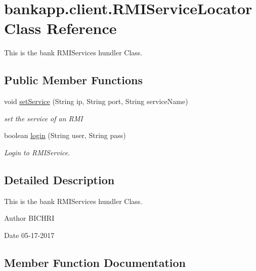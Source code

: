 \hypertarget{classbankapp_1_1client_1_1RMIServiceLocator}{}\section{bankapp.\+client.\+R\+M\+I\+Service\+Locator Class Reference}
\label{classbankapp_1_1client_1_1RMIServiceLocator}


This is the bank R\+M\+I\+Services hundler Class.  


\subsection*{Public Member Functions}
\begin{DoxyCompactItemize}
\item 
void \hyperlink{classbankapp_1_1client_1_1RMIServiceLocator_a9a1605fa6be3933008e90db56b804007}{set\+Service} (String ip, String port, String service\+Name)
\begin{DoxyCompactList}\small\item\em set the service of an R\+MI \end{DoxyCompactList}\item 
boolean \hyperlink{classbankapp_1_1client_1_1RMIServiceLocator_a2287058ad6e7eaa5b38303c02102d740}{login} (String user, String pass)
\begin{DoxyCompactList}\small\item\em Login to R\+M\+I\+Service. \end{DoxyCompactList}\end{DoxyCompactItemize}


\subsection{Detailed Description}
This is the bank R\+M\+I\+Services hundler Class. 

\begin{DoxyAuthor}{Author}
B\+I\+C\+H\+RI 
\end{DoxyAuthor}
\begin{DoxyDate}{Date}
05-\/17-\/2017 
\end{DoxyDate}


\subsection{Member Function Documentation}
\mbox{\label{classbankapp_1_1client_1_1RMIServiceLocator_a2287058ad6e7eaa5b38303c02102d740}} 
